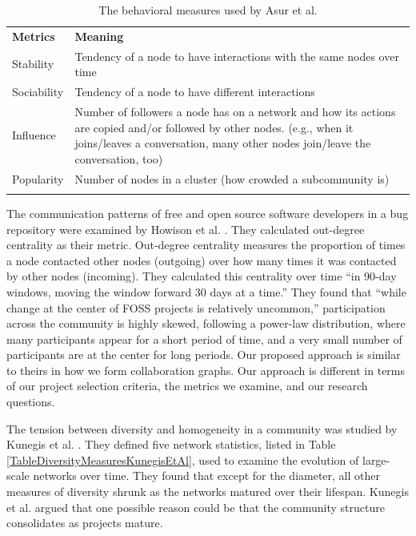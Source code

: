 \documentclass[11pt]{report}
\begin{document}
\begin{table}[!htbp]
\caption{The behavioral measures used by Asur et al. \cite{Asur}}
\label{tableDiversityMeasuresAsurEtAl} 
\begin{tabular}{p{} p{}}
\hline\noalign{\smallskip}
\textbf{Metrics} & \textbf{Meaning} \\
\noalign{\smallskip}\hline\noalign{\smallskip}
Stability & Tendency of a node to have interactions with the same nodes over time \\ \hline
Sociability & Tendency of a node to have different interactions \\\hline
Influence & Number of followers a node has on a network and how its actions are copied and/or followed by other nodes. (e.g., when it joins/leaves a conversation, many other nodes join/leave the conversation, too) \\\hline
Popularity & Number of nodes in a cluster (how crowded a subcommunity is) \\
\noalign{\smallskip}\hline
\end{tabular}
\end{table}

The communication patterns of free and open source software developers in a bug repository were examined by Howison et al. \cite{HowisonSocialDynamics}. They calculated out-degree centrality as their metric. Out-degree centrality measures the proportion of times a node contacted other nodes (outgoing) over how many times it was contacted by other nodes (incoming). They calculated this centrality over time ``in 90-day windows, moving the window forward 30 days at a time.'' They found that ``while change at the center of FOSS projects is relatively uncommon,'' participation across the community is highly skewed, following a power-law distribution, where many participants appear for a short period of time, and a very small number of participants are at the center for long periods. Our proposed approach is similar to theirs in how we form collaboration graphs. Our approach is different in terms of our project selection criteria, the metrics we examine, and our research questions.

The tension between diversity and homogeneity in a community was studied by Kunegis et al. \cite{Kunegis}. They defined five network statistics, listed in Table \ref{TableDiversityMeasuresKunegisEtAl}, used to examine the evolution of large-scale networks over time. They found that except for the diameter, all other measures of diversity shrunk as the networks matured over their lifespan. Kunegis et al. \cite{Kunegis} argued that one possible reason could be that the community structure consolidates as projects mature.
\end{document}

